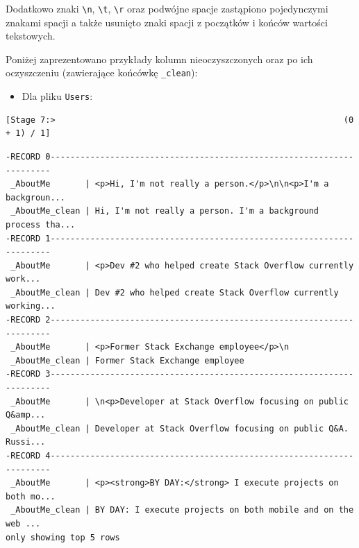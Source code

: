 \documentclass[
  letterpaper,
  DIV=11,
  numbers=noendperiod]{scrreprt}
\providecommand{\tightlist}{%
  \setlength{\itemsep}{0pt}\setlength{\parskip}{0pt}}\usepackage{longtable,booktabs,array}
\begin{document}
\small

\normalsize

Dodatkowo znaki \texttt{\textbackslash{}n}, \texttt{\textbackslash{}t},
\texttt{\textbackslash{}r} oraz podwójne spacje zastąpiono pojedynczymi
znakami spacji a także usunięto znaki spacji z początków i końców
wartości tekstowych.

Poniżej zaprezentowano przykłady kolumn nieoczyszczonych oraz po ich
oczyszczeniu (zawierające końcówkę \texttt{\_clean}):

\begin{itemize}
\tightlist
\item
  Dla pliku \texttt{Users}: \small
\end{itemize}

\begin{verbatim}
[Stage 7:>                                                          (0 + 1) / 1]
\end{verbatim}

\begin{verbatim}
-RECORD 0----------------------------------------------------------------------
 _AboutMe       | <p>Hi, I'm not really a person.</p>\n\n<p>I'm a backgroun... 
 _AboutMe_clean | Hi, I'm not really a person. I'm a background process tha... 
-RECORD 1----------------------------------------------------------------------
 _AboutMe       | <p>Dev #2 who helped create Stack Overflow currently work... 
 _AboutMe_clean | Dev #2 who helped create Stack Overflow currently working... 
-RECORD 2----------------------------------------------------------------------
 _AboutMe       | <p>Former Stack Exchange employee</p>\n                      
 _AboutMe_clean | Former Stack Exchange employee                               
-RECORD 3----------------------------------------------------------------------
 _AboutMe       | \n<p>Developer at Stack Overflow focusing on public Q&amp... 
 _AboutMe_clean | Developer at Stack Overflow focusing on public Q&A. Russi... 
-RECORD 4----------------------------------------------------------------------
 _AboutMe       | <p><strong>BY DAY:</strong> I execute projects on both mo... 
 _AboutMe_clean | BY DAY: I execute projects on both mobile and on the web ... 
only showing top 5 rows
\end{verbatim}

\begin{verbatim}
                                                                                
\end{verbatim}
\end{document}
